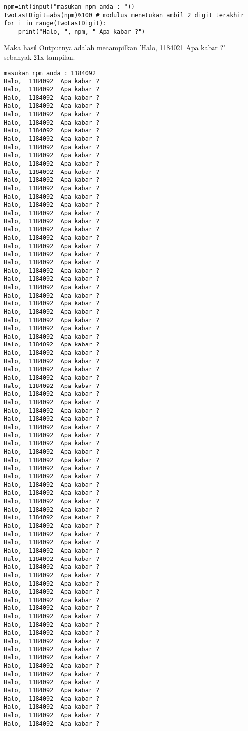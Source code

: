 \begin{enumerate}
\begin{verbatim}
npm=int(input("masukan npm anda : "))
TwoLastDigit=abs(npm)%100 # modulus menetukan ambil 2 digit terakhir
for i in range(TwoLastDigit):
    print("Halo, ", npm, " Apa kabar ?")
\end{verbatim}
Maka hasil Outputnya adalah menampilkan 'Halo, 1184021 Apa kabar ?' sebanyak 21x tampilan. 
\begin{verbatim}
masukan npm anda : 1184092
Halo,  1184092  Apa kabar ?
Halo,  1184092  Apa kabar ?
Halo,  1184092  Apa kabar ?
Halo,  1184092  Apa kabar ?
Halo,  1184092  Apa kabar ?
Halo,  1184092  Apa kabar ?
Halo,  1184092  Apa kabar ?
Halo,  1184092  Apa kabar ?
Halo,  1184092  Apa kabar ?
Halo,  1184092  Apa kabar ?
Halo,  1184092  Apa kabar ?
Halo,  1184092  Apa kabar ?
Halo,  1184092  Apa kabar ?
Halo,  1184092  Apa kabar ?
Halo,  1184092  Apa kabar ?
Halo,  1184092  Apa kabar ?
Halo,  1184092  Apa kabar ?
Halo,  1184092  Apa kabar ?
Halo,  1184092  Apa kabar ?
Halo,  1184092  Apa kabar ?
Halo,  1184092  Apa kabar ?
Halo,  1184092  Apa kabar ?
Halo,  1184092  Apa kabar ?
Halo,  1184092  Apa kabar ?
Halo,  1184092  Apa kabar ?
Halo,  1184092  Apa kabar ?
Halo,  1184092  Apa kabar ?
Halo,  1184092  Apa kabar ?
Halo,  1184092  Apa kabar ?
Halo,  1184092  Apa kabar ?
Halo,  1184092  Apa kabar ?
Halo,  1184092  Apa kabar ?
Halo,  1184092  Apa kabar ?
Halo,  1184092  Apa kabar ?
Halo,  1184092  Apa kabar ?
Halo,  1184092  Apa kabar ?
Halo,  1184092  Apa kabar ?
Halo,  1184092  Apa kabar ?
Halo,  1184092  Apa kabar ?
Halo,  1184092  Apa kabar ?
Halo,  1184092  Apa kabar ?
Halo,  1184092  Apa kabar ?
Halo,  1184092  Apa kabar ?
Halo,  1184092  Apa kabar ?
Halo,  1184092  Apa kabar ?
Halo,  1184092  Apa kabar ?
Halo,  1184092  Apa kabar ?
Halo,  1184092  Apa kabar ?
Halo,  1184092  Apa kabar ?
Halo,  1184092  Apa kabar ?
Halo,  1184092  Apa kabar ?
Halo,  1184092  Apa kabar ?
Halo,  1184092  Apa kabar ?
Halo,  1184092  Apa kabar ?
Halo,  1184092  Apa kabar ?
Halo,  1184092  Apa kabar ?
Halo,  1184092  Apa kabar ?
Halo,  1184092  Apa kabar ?
Halo,  1184092  Apa kabar ?
Halo,  1184092  Apa kabar ?
Halo,  1184092  Apa kabar ?
Halo,  1184092  Apa kabar ?
Halo,  1184092  Apa kabar ?
Halo,  1184092  Apa kabar ?
Halo,  1184092  Apa kabar ?
Halo,  1184092  Apa kabar ?
Halo,  1184092  Apa kabar ?
Halo,  1184092  Apa kabar ?
Halo,  1184092  Apa kabar ?
Halo,  1184092  Apa kabar ?
Halo,  1184092  Apa kabar ?
Halo,  1184092  Apa kabar ?
Halo,  1184092  Apa kabar ?
Halo,  1184092  Apa kabar ?
Halo,  1184092  Apa kabar ?
Halo,  1184092  Apa kabar ?
Halo,  1184092  Apa kabar ?
Halo,  1184092  Apa kabar ?
Halo,  1184092  Apa kabar ?

\end{verbatim}
\end{enumerate}
